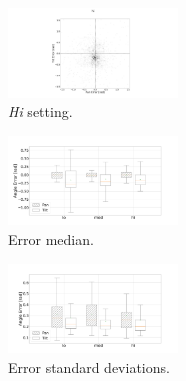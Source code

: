 \documentclass[sigconf, review=true, screen=true, anonymous=true]{acmart}
\begin{document}
\begin{figure}
  \centering
  \includegraphics[clip, trim=450 0 450 60, width=0.4\textwidth]{figures/err_hi.png}
  \caption{\emph{Hi} setting. }
  \label{fig:err-results-hi}
\end{figure}

\begin{figure}
  \centering
  \includegraphics[clip, trim=20 -70 100 100, width=0.4\textwidth]{figures/err_boxplot_medians.png}
  \caption{Error median.}
  \label{fig:err-boxplot-median}
\end{figure}
\begin{figure}
  \centering
  \includegraphics[clip, trim=80 -70 100 0, width=0.4\textwidth]{figures/err_boxplot_std.png}
  \caption{Error standard deviations.}
  \label{fig:err-boxplot-std}
\end{figure}
\end{document}
